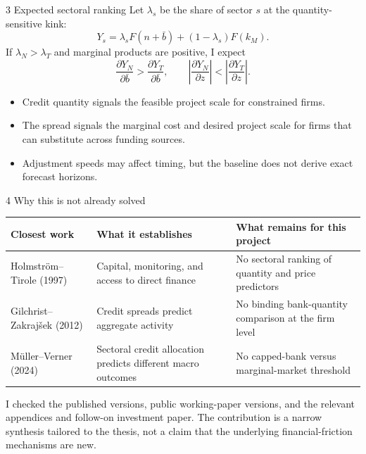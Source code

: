 \documentclass[aspectratio=169,11pt]{beamer}
\begin{document}
\begin{frame}{3 \textperiodcentered{} Expected sectoral ranking}
Let $\lambda_s$ be the share of sector $s$ at the quantity-sensitive kink:
\[
Y_s=\lambda_s F(n+\bar b)+(1-\lambda_s)F(k_M).
\]
If $\lambda_N>\lambda_T$ and marginal products are positive, I expect
\[
 \frac{\partial Y_N}{\partial\bar b}>
 \frac{\partial Y_T}{\partial\bar b},
 \qquad
 \left|\frac{\partial Y_N}{\partial z}\right|<
 \left|\frac{\partial Y_T}{\partial z}\right|.
\]

\begin{itemize}
  \item Credit quantity signals the feasible project scale for constrained firms.
  \item The spread signals the marginal cost and desired project scale for firms
        that can substitute across funding sources.
  \item Adjustment speeds may affect timing, but the baseline does not derive
        exact forecast horizons.
\end{itemize}
\end{frame}

\begin{frame}{4 \textperiodcentered{} Why this is not already solved}
\small
\begin{tabular}{p{.25\linewidth}p{.30\linewidth}p{.35\linewidth}}
\toprule
\textbf{Closest work} & \textbf{What it establishes} & \textbf{What remains for this project}\\
\midrule
Holmstr\"om--Tirole (1997) & Capital, monitoring, and access to direct finance & No sectoral ranking of quantity and price predictors\\
Gilchrist--Zakraj\v{s}ek (2012) & Credit spreads predict aggregate activity & No binding bank-quantity comparison at the firm level\\
M\"uller--Verner (2024) & Sectoral credit allocation predicts different macro outcomes & No capped-bank versus marginal-market threshold\\
\bottomrule
\end{tabular}

\medskip
I checked the published versions, public working-paper versions, and the
relevant appendices and follow-on investment paper. The contribution is a
narrow synthesis tailored to the thesis, not a claim that the underlying
financial-friction mechanisms are new.
\end{frame}
\end{document}
